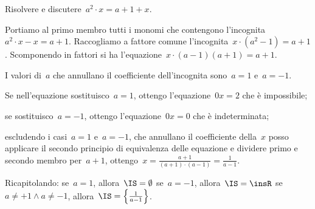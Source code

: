  \begin{esempio}
Risolvere e discutere~\(a^{2}\cdot x=a+1+x\).

Portiamo al primo membro tutti i monomi che contengono 
l'incognita~\(a^{2}\cdot x-x=a+1\).
Raccogliamo a fattore comune l'incognita~\(x\cdot \left(a^{2}-1\right)=a+1\).
Scomponendo in fattori si ha 
l'equazione~\(x\cdot \left(a-1\right)\left(a+1\right)=a+1\).

I valori di~\(a\) che annullano il coefficiente dell'incognita 
sono~\(a=1\) e~\(a=-1\).
\begin{itemize*}
 \item Se nell'equazione sostituisco~\(a=1\), ottengo l'equazione~\(0x=2\) che è 
 impossibile;
 \item se sostituisco~\(a=-1\), ottengo l'equazione~\(0x=0\) che è indeterminata;
 \item escludendo i casi~\(a=1\) e~\(a=-1\), che annullano il coefficiente 
  della~\(x\) posso applicare il secondo principio
  di equivalenza delle equazione e dividere primo e secondo membro 
  per~\(a+1\), 
  ottengo~\(x=\frac{a+1}{\left(a+1\right)\cdot \left(a-1\right)}=\frac{1}{a-1}\).
\end{itemize*}
 \end{esempio}
Ricapitolando:
se~\(a=1\), 
allora~\(\IS=\emptyset\) se~\(a=-1\), allora~\(\IS=\insR\) 
se~\(a\neq +1\wedge a\neq -1\), 
allora~\(\IS=\left\{\frac{1}{a-1}\right\}\).\vspace*{1.05ex}

